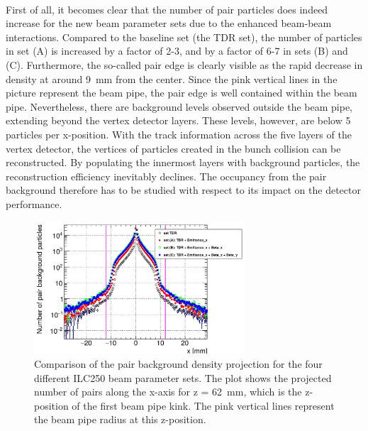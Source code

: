 \\First of all, it becomes clear that the number of pair particles does indeed increase for the new beam parameter sets due to the enhanced beam-beam interactions.
Compared to the baseline set (the TDR set), the number of particles in set (A) is increased by a factor of 2-3, and by a factor of 6-7 in sets (B) and (C).
Furthermore, the so-called pair edge is clearly visible as the rapid decrease in density at around \SI{9}{\milli\meter} from the center.
Since the pink vertical lines in the picture represent the beam pipe, the pair edge is well contained within the beam pipe.
Nevertheless, there are background levels observed outside the beam pipe, extending beyond the vertex detector layers.
These levels, however, are below 5 particles per x-position.
With the track information across the five layers of the vertex detector, the vertices of particles created in the bunch collision can be reconstructed.
By populating the innermost layers with background particles, the reconstruction efficiency inevitably declines.
The occupancy from the pair background therefore has to be studied with respect to its impact on the detector performance.
\begin{figure}
    \centering
    \includegraphics[width=0.7\textwidth]{Figures/Pairs/HelixEnvelope_Projection_Comparison_250GeV_parametersets_LEG.png}
    \caption[Pair background density projection for different ILC250 beam parameter sets]{
    Comparison of the pair background density projection for the four different ILC250 beam parameter sets.
    The plot shows the projected number of pairs along the x-axis for z = \SI[detect-all]{62}{\milli\meter}, which is the z-position of the first beam pipe kink.
    The pink vertical lines represent the beam pipe radius at this z-position.
    }
    \label{fig:PairBkg:Density_Projection}
\end{figure}

